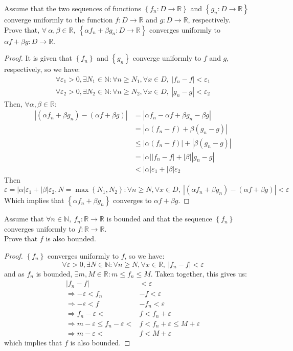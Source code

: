 \documentclass{article}
\newcommand{\abs}[1]{\left|#1\right|}
\newcommand{\bracks}[1]{\left\{#1\right\}}
\newcommand{\vep}{\varepsilon}
\begin{document}
	\item Assume that the two sequences of functions $\bracks{f_n: D \rightarrow \mathbb{R}}$ and $\bracks{g_n: D \rightarrow \mathbb{R}}$ converge uniformly to the function $f : D \rightarrow \mathbb{R}$ and $g : D \rightarrow \mathbb{R}$, respectively.\\ Prove that, $\forall\ \alpha, \beta \in \mathbb{R},\ \bracks{\alpha f_n + \beta g_n : D \rightarrow \mathbb{R}}$ converges uniformly to $\alpha f + \beta g : D \rightarrow \mathbb{R}$.
	\begin{proof}
	It is given that $\bracks{f_n}$ and $\bracks{g_n}$ converge uniformly to $f$ and $g$, respectively, so we have:
	\begin{align*}
	\forall \vep_1 > 0, \exists N_1 \in \mathbb{N}: \forall n \geq N_1, \forall x \in D,\ \abs{f_n - f} < \vep_1 \\
	\forall \vep_2 > 0, \exists N_2 \in \mathbb{N}: \forall n \geq N_2, \forall x \in D,\ \abs{g_n - g} < \vep_2
	\end{align*}
	Then, $\forall \alpha, \beta \in \mathbb{R}$:
	\begin{align*}
	\abs{(\alpha f_n + \beta g_n) - (\alpha f + \beta g)} &= \abs{\alpha f_n - \alpha f + \beta g_n - \beta g}\\
	&= \abs{\alpha (f_n - f) + \beta (g_n - g)}\\
	&\leq \abs{\alpha(f_n-f)} + \abs{\beta(g_n-g)}\\
	&= \abs{\alpha}\abs{f_n-f} + \abs{\beta}\abs{g_n-g}\\
	&< \abs{\alpha}\vep_1 + \abs{\beta}\vep_2
	\end{align*}
	Then
	$$\vep = \abs{\alpha}\vep_1 + \abs{\beta}\vep_2, N = \max\bracks{N_1,N_2} : \forall n \geq N, \forall x \in D,\ \abs{(\alpha f_n + \beta g_n) - (\alpha f + \beta g)} < \vep$$
	Which implies that $\bracks{\alpha f_n + \beta g_n}$ converges to $\alpha f + \beta g$.
	\end{proof}	
	
	\item Assume that $\forall n \in \mathbb{N},\ f_n : \mathbb{R} \rightarrow \mathbb{R}$ is bounded and that the sequence $\bracks{f_n}$ converges uniformly to $f : \mathbb{R} \rightarrow \mathbb{R}$.\\
	Prove that $f$ is also bounded.
	\begin{proof}
	$\bracks{f_n}$ converges uniformly to $f$, so we have:
	$$\forall \vep > 0, \exists N \in \mathbb{N}: \forall n \geq N, \forall x \in \mathbb{R},\ \abs{f_n - f} < \vep$$
	and as $f_n$ is bounded, $\exists m, M \in \mathbb{R}: m \leq f_n \leq M$. Taken together, this gives us:
	\begin{align*}
	\abs{f_n - f} &< \vep\\
	\Rightarrow -\vep < f_n &- f < \vep\\
	\Rightarrow -\vep < f &- f_n < \vep\\
	\Rightarrow f_n - \vep < &f < f_n + \vep\\
	\Rightarrow m - \vep \leq f_n - \vep < &f < f_n + \vep \leq M + \vep\\
	\Rightarrow m - \vep < &f < M + \vep
	\end{align*}
	which implies that $f$ is also bounded.
	\end{proof}
	
\end{document}
